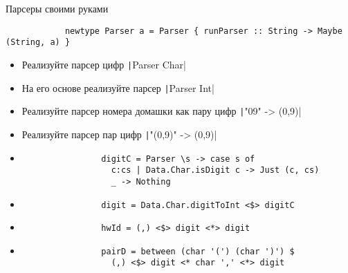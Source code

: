     \begin{frame}[fragile]{Парсеры своими руками}
        \begin{verbatim}
            newtype Parser a = Parser { runParser :: String -> Maybe (String, a) }
        \end{verbatim}
        \begin{itemize}
            \item[\todo] Реализуйте парсер цифр \texttt|Parser Char|
            \item[\todo] На его основе реализуйте парсер \texttt|Parser Int|
            \item[\todo] Реализуйте парсер номера домашки как пару цифр \texttt|"09" -> (0,9)|
            \item[\todo] Реализуйте парсер пар цифр \texttt|"(0,9)" -> (0,9)|
            \item[\answer] \pause
            \begin{verbatim}
                digitC = Parser \s -> case s of
                  c:cs | Data.Char.isDigit c -> Just (c, cs)
                  _ -> Nothing
            \end{verbatim}
            \item[\answer] \pause
            \begin{verbatim}
                digit = Data.Char.digitToInt <$> digitC
            \end{verbatim}
            \item[\answer] \pause
            \begin{verbatim}
                hwId = (,) <$> digit <*> digit
            \end{verbatim}
            \item[\answer] \pause
            \begin{verbatim}
                pairD = between (char '(') (char ')') $
                  (,) <$> digit <* char ',' <*> digit
            \end{verbatim}
        \end{itemize}
    \end{frame}
    

